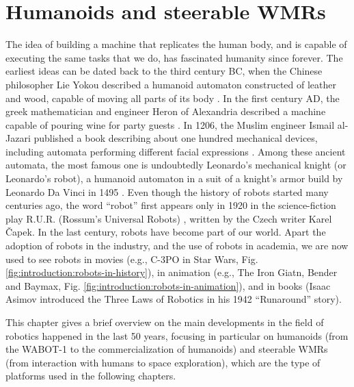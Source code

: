 \chapter{Humanoids and steerable WMRs}
\label{ch:humanoids-and-swmrs}
The idea of building a machine that replicates the human body, and is capable 
of executing the same tasks that we do, has fascinated humanity since forever.
The earliest ideas can be dated back to the third century BC, when the 
Chinese philosopher Lie Yokou described a humanoid automaton constructed of 
leather and wood, capable of moving all parts of its body
\cite{Needham1956ScienceandCivilisationinChinaVol2}. In the first century AD,
the greek mathematician and engineer Heron of Alexandria described a machine 
capable of pouring wine for party guests \cite{Alexandria2015Pneumatica}.
In 1206, the Muslim engineer Ismail al-Jazari published a book describing 
about one hundred mechanical devices, including automata performing different 
facial expressions \cite{AlJarari1206BookofKnowledge}. Among these ancient
automata, the most famous one is undoubtedly Leonardo's mechanical knight 
(or Leonardo's robot), a humanoid automaton in a suit of a knight's armor
build by Leonardo Da Vinci in 1495 \cite{Moran2006TheDaVinciRobot}.
Even though the history of robots started many centuries ago, the word ``robot''
first appears only in 1920 in the science-fiction play R.U.R.
(Rossum's Universal Robots) \cite{Capek1920RUR}, written by the Czech writer
Karel {\v C}apek.
In the last century, robots have become part of our world. Apart the adoption 
of robots in the industry, and the use of robots in academia, we are now 
used to see robots in movies (e.g., C-3PO in Star Wars,
Fig. \ref{fig:introduction:robots-in-history}), in animation (e.g., The Iron
Giatn, Bender and Baymax, Fig.
\ref{fig:introduction:robots-in-animation}), and in books (Isaac Asimov
introduced the Three Laws of Robotics in his 1942 ``Runaround'' story).

This chapter gives a brief overview on the main developments in the field of 
robotics happened in the last 50 years, focusing in particular on humanoids
(from the WABOT-1 to the commercialization of humanoids)
and steerable WMRs (from interaction with humans to space exploration),
which are the type of platforms used in the following chapters.

